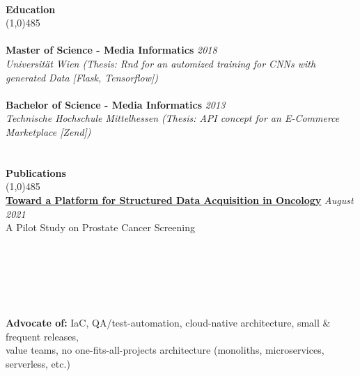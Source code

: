 \documentclass[9pt]{extarticle}
\newcommand\tab[1][1cm]{\hspace*{#1}}
\newcommand\smallspace[1][0.23cm]{\hspace*{#1}}
\newcommand\negativespace[1][-0.12cm]{\hspace*{#1}}
\begin{document}
\noindent %
\\
\vspace*{-6pt}
{\negativespace \Large \bf Education}\\
\line(1,0){485}\\
\\
\noindent
{\bf Master of Science - Media Informatics} \hfill \textit{2018} \\ 
\textit{Universität Wien (Thesis: Rnd for an automized training for CNNs with generated Data [Flask, Tensorflow])} \\\\
\noindent
{\bf Bachelor of Science - Media Informatics} \hfill \textit{2013} \\
\textit{Technische Hochschule Mittelhessen (Thesis: API concept for an E-Commerce Marketplace [Zend])} \\
\\
\\
\vspace*{-6pt}
{\negativespace \Large \bf Publications}\\
\line(1,0){485}\\
{\bf \href{https://www.researchgate.net/publication/354259954_Toward_a_Platform_for_Structured_Data_Acquisition_in_Oncology_A_Pilot_Study_on_Prostate_Cancer_Screening}{Toward a Platform for Structured Data Acquisition in Oncology}} \hfill \textit{August 2021} \\ 
A Pilot Study on Prostate Cancer Screening \\ 
\\
\\
\\
\\
\\
\\
\noindent
{\bf Advocate of:} IaC, QA/test-automation, cloud-native architecture, small \& frequent releases,\\ 
 \tab \tab \smallspace value teams, no one-fits-all-projects architecture (monoliths, microservices, serverless, etc.) \\
\end{document}
